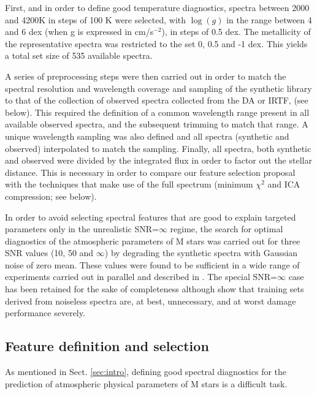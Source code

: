 First, and in order to define good temperature diagnostics, spectra
between 2000 and 4200K in steps of 100 K were selected, with $\log(g)$
in the range between 4 and 6 dex (when g is expressed in cm/s$^{-2}$),
in steps of 0.5 dex. The metallicity of the representative spectra was
restricted to the set 0, 0.5 and -1 dex.  This yields a total set size
of 535 available spectra.

A series of preprocessing steps were then carried out in order to
match the spectral resolution and wavelength coverage and sampling of
the synthetic library to that of the 
collection of observed spectra collected from the DA or IRTF, (see below). 
This required the definition of a common
wavelength range present in all available observed spectra, and the
subsequent trimming to match that range. A unique wavelength sampling
was also defined and all spectra (synthetic and observed) interpolated
to match the sampling. Finally, all spectra, both synthetic and
observed were divided by the integrated flux in order to factor out
the stellar distance. This is necessary in order to compare our
feature selection proposal with the techniques that make use of the
full spectrum (minimum $\chi^2$ and ICA compression; see below).

In order to avoid selecting spectral features that are 
good to explain targeted parameters 
only in the unrealistic SNR=$\infty$ regime, the search for optimal
diagnostics of the atmospheric parameters of M stars was carried out
for three SNR values (10, 50 and $\infty$) by degrading the synthetic
spectra with Gaussian noise of zero mean. These values were found to
be sufficient in a wide range of experiments carried out in parallel
and described in \cite{2017MNRAS.465.4556G}. The special SNR=$\infty$
case has been retained for the sake of completeness
although \cite{2017MNRAS.465.4556G} show that training sets derived
from noiseless spectra are, at best, unnecessary, and at worst damage
performance severely.

\subsection{Feature definition and selection}
\label{subsec:FD}

As mentioned in Sect. \ref{sec:intro}, defining good spectral
diagnostics for the prediction of atmospheric physical parameters of M
stars is a difficult task.


